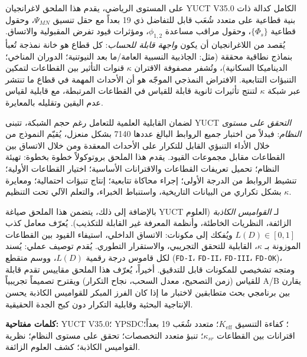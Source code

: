 \documentclass[13pt,a4paper]{article}
\newcommand{\Keff}{K_{\mathrm{eff}}}
\begin{document}
\begin{titlepage}
\begin{center}
\begin{minipage}{0.92\textwidth}
				على المستوى الرياضي، يقدم هذا الملحق لاغرانجيان YUCT V35.0 الكامل كدالة ذات بنية قطاعية على متعدد شُعَب قابل للتفاضل ذي 19 بعداً مع حقل تنسيق $\Psi_{MN}$، وحقول قطاعية $\{\Phi_s\}$، وحقول مراقب مساعدة $\phi_{1,2}$، ومؤثرات قيود تفرض المقبولية والاتساق. يُقصد من اللاغرانجيان أن يكون \emph{واجهة قابلة للحساب}: كل قطاع هو خانة نمذجة تُعبأ بنماذج نطاقية محققة (مثل: الجاذبية النسبية العامة/ما بعد النيوتنية؛ الدوران المناخي؛ الديناميكا السكانية)، وتُشفر مصفوفة الاقتران $\kappa$ قنوات التأثير بين القطاعات لتمكين التنبؤات التتابعية. الافتراض النمذجي الموجّه هو أن الأحداث المهمة في قطاع ما تنتشر عبر شبكة $\kappa$ لتنتج تأثيرات ثانوية قابلة للقياس في القطاعات المرتبطة، مع قابلية لقياس عدم اليقين وتقليله بالمعايرة.
				
				لضمان القابلية العلمية للتعامل رغم حجم الشبكة، تتبنى YUCT \emph{التحقق على مستوى النظام}: فبدلاً من اختبار جميع الروابط البالغ عددها 7140 بشكل منعزل، يُقيّم النموذج من خلال الأداء التنبؤي القابل للتكرار على الأحداث المعقدة ومن خلال الاتساق بين القطاعات مقابل مجموعات القيود. يقدم هذا الملحق بروتوكولاً خطوة بخطوة: تهيئة النظام؛ تحميل تعريفات القطاعات والاقترانات الأساسية؛ اختيار القطاعات الأولية؛ تنشيط الروابط من الدرجة الأولى؛ إجراء محاكاة تتابعية؛ إنتاج تنبؤات احتمالية؛ ومعايرة $\kappa$ بشكل تكراري من البيانات التاريخية، واستنباط الخبراء، والتعلم الآلي تحت التنظيم.
				
				بالإضافة إلى ذلك، يتضمن هذا الملحق صياغة YUCT لـ \emph{القواميس الكاذبة} (العلوم الزائفة، النظريات الخاطئة، وأنظمة المعرفة غير القابلة للتكذيب). يُعرّف معامل كذب $L(D)\in[0,1]$ ويُفكك إلى مكونات: الاتساق الداخلي، استيفاء القيود بين القطاعات الموزونة بـ $\kappa$، القابلية للتحقق التجريبي، والاستقرار التطوري. يُقدم توصيف عملي: يُسند لكل قاموس درجة رقمية $L(D)$، ووسم متقطع (\texttt{FD-I}، \texttt{FD-II}، \texttt{FD-III}، \texttt{FD-OK})، ومتجه تشخيصي للمكونات قابل للتدقيق. أخيراً، يُعرّف هذا الملحق مقاييس تقدم قابلة للقياس (زمن التصحيح، معدل السحب، نجاح التكرار) ويقترح تصميماً تجريبياً A/B يقارن بين برنامجي بحث متطابقين لاختبار ما إذا كان الفرز المبكر للقواميس الكاذبة يحسن الإنتاجية البحثية وقابلية التكرار دون كبح الجدة الحقيقية.
			\end{minipage}
			
			\vfill
			\small
			\textbf{كلمات مفتاحية:} YUCT V35.0؛ YPSDC؛ كفاءة التنسيق $\Keff$؛ متعدد شُعَب 19 بعداً؛ اقترانات بين القطاعات $\kappa_{sr}$؛ تنبؤ متعدد التخصصات؛ تحقق على مستوى النظام؛ نظرية القواميس الكاذبة؛ كشف العلوم الزائفة.
		\end{center}
	\end{titlepage}
	
\end{document}
